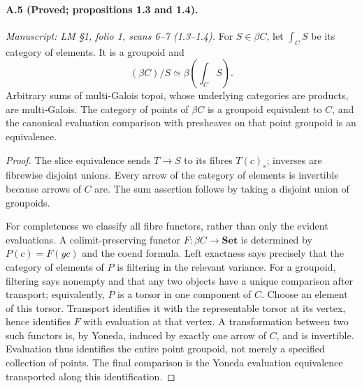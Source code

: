 \paragraph{A.5 (Proved; propositions 1.3 and 1.4).}
\textit{Manuscript: LM \S1, folio 1, scans 6--7 (1.3--1.4).}
For $S\in\beta C$, let $\int_C S$ be its category of elements. It is a groupoid and
\[
 (\beta C)/S\simeq\beta\!\left(\int_C S\right).
\]
Arbitrary sums of multi-Galois topoi, whose underlying categories are products, are multi-Galois. The category of points of $\beta C$ is a groupoid equivalent to $C$, and the canonical evaluation comparison with presheaves on that point groupoid is an equivalence.
\begin{proof}
The slice equivalence sends $T\to S$ to its fibres $T(c)_s$; inverses are fibrewise disjoint unions. Every arrow of the category of elements is invertible because arrows of $C$ are. The sum assertion follows by taking a disjoint union of groupoids.

For completeness we classify all fibre functors, rather than only the evident evaluations. A colimit-preserving functor $F:\beta C\to\mathbf{Set}$ is determined by $P(c)=F(yc)$ and the coend formula. Left exactness says precisely that the category of elements of $P$ is filtering in the relevant variance. For a groupoid, filtering says nonempty and that any two objects have a unique comparison after transport; equivalently, $P$ is a torsor in one component of $C$. Choose an element of this torsor. Transport identifies it with the representable torsor at its vertex, hence identifies $F$ with evaluation at that vertex. A transformation between two such functors is, by Yoneda, induced by exactly one arrow of $C$, and is invertible. Evaluation thus identifies the entire point groupoid, not merely a specified collection of points. The final comparison is the Yoneda evaluation equivalence transported along this identification. 
\end{proof}


